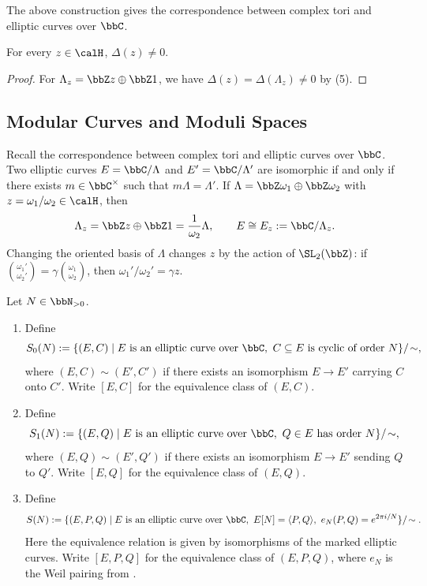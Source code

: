 \begin{remark}
    The above construction gives the correspondence between complex tori and elliptic curves over $\bbC$.
\end{remark}

\begin{corollary}\label{Cor:MF_discriminant_nonzero}
    For every $z \in \calH$, $\Delta(z) \neq 0$.
\end{corollary}

\begin{proof}
    For $\Lambda_z = \bbZ z \oplus \bbZ 1$, we have $\Delta(z) = \Delta(\Lambda_z) \neq 0$ by (5).
\end{proof}

\subsection{Modular Curves and Moduli Spaces}\label{Sec:MF_moduli_spaces}

Recall the correspondence between complex tori and elliptic curves over $\bbC$. Two elliptic curves $E = \bbC/\Lambda$ and $E' = \bbC/\Lambda'$ are isomorphic if and only if there exists $m \in \bbC^\times$ such that $m\Lambda = \Lambda'$. If $\Lambda = \bbZ\omega_1 \oplus \bbZ\omega_2$ with $z = \omega_1/\omega_2 \in \calH$, then
\[
    \Lambda_z = \bbZ z \oplus \bbZ 1 = \frac{1}{\omega_2}\Lambda, \qquad E \cong E_z := \bbC/\Lambda_z.
\]
Changing the oriented basis of $\Lambda$ changes $z$ by the action of $\SL_2(\bbZ)$: if $\binom{\omega_1'}{\omega_2'} = \gamma\binom{\omega_1}{\omega_2}$, then $\omega_1'/\omega_2' = \gamma z$.

\begin{definition}\label{Def:MF_moduli_sets}
    Let $N \in \bbN_{>0}$.
    \begin{enumerate}
        \item Define
        \[
            S_0(N) := \{(E, C) \mid E \text{ is an elliptic curve over } \bbC,\ C \subseteq E \text{ is cyclic of order } N\}/\!\sim,
        \]
        where $(E, C) \sim (E', C')$ if there exists an isomorphism $E \to E'$ carrying $C$ onto $C'$. Write $[E, C]$ for the equivalence class of $(E, C)$.
        \item Define
        \[
            S_1(N) := \{(E, Q) \mid E \text{ is an elliptic curve over } \bbC,\ Q \in E \text{ has order } N\}/\!\sim,
        \]
        where $(E, Q) \sim (E', Q')$ if there exists an isomorphism $E \to E'$ sending $Q$ to $Q'$. Write $[E, Q]$ for the equivalence class of $(E, Q)$.
        \item Define
        \[
            S(N) := \{(E, P, Q) \mid E \text{ is an elliptic curve over } \bbC,\ E[N] = \langle P, Q\rangle,\ e_N(P, Q) = e^{2\pi i/N}\}/\!\sim.
        \]
        Here the equivalence relation is given by isomorphisms of the marked elliptic curves. Write $[E, P, Q]$ for the equivalence class of $(E, P, Q)$, where $e_N$ is the Weil pairing from .
    \end{enumerate}
\end{definition}

